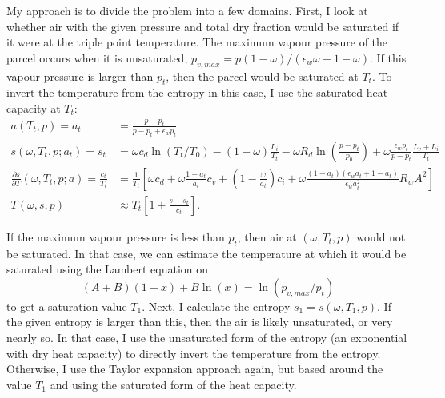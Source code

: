\documentclass{article}
\newcommand{\epsw}{\epsilon_w}
\begin{document}
My approach is to divide the problem into a few domains. First, I look at whether air with the given pressure and total dry fraction would be saturated if it were at the triple point temperature. The maximum vapour pressure of the parcel occurs when it is unsaturated, $p_{v,max} = p (1-\omega)/(\epsw \omega + 1-\omega)$. If this vapour pressure is larger than $p_t$, then the parcel would be saturated at $T_t$. To invert the temperature from the entropy in this case, I use the saturated heat capacity at $T_t$:
\begin{align*}
    a(T_t,p) = a_t &= \frac{p-p_t}{p-p_t + \epsw p_t} \\
    s(\omega,T_t,p;a_t) = s_t &= \omega c_d \ln(T_t/T_0) - (1-\omega) \frac{L_i}{T_t} - \omega R_d \ln\left( \frac{p-p_t}{p_0} \right) + \omega \frac{\epsw p_t}{p - p_t} \frac{L_v+L_i}{T_t} \\
    \frac{\partial s}{\partial T}(\omega,T_t,p;a) = \frac{c_t}{T_t} &= \frac{1}{T_t} \left[ \omega c_d + \omega \frac{1-a_t}{a_t} c_v + \left( 1 - \frac{\omega}{a_t} \right) c_i + \omega \frac{(1-a_t) (\epsw a_t + 1-a_t)}{\epsw a_t^2} R_w A^2 \right] \\
    T(\omega,s,p) &\approx T_t \left[ 1 + \frac{s-s_t}{c_t} \right].
\end{align*}

If the maximum vapour pressure is less than $p_t$, then air at $(\omega,T_t,p)$ would not be saturated. In that case, we can estimate the temperature at which it would be saturated using the Lambert equation on
\begin{equation*}
    (A+B) (1-x) + B \ln(x) = \ln(p_{v,max}/p_t)
\end{equation*}
to get a saturation value $T_1$. Next, I calculate the entropy $s_1 = s(\omega,T_1,p)$. If the given entropy is larger than this, then the air is likely unsaturated, or very nearly so. In that case, I use the unsaturated form of the entropy (an exponential with dry heat capacity) to directly invert the temperature from the entropy. Otherwise, I use the Taylor expansion approach again, but based around the value $T_1$ and using the saturated form of the heat capacity. 
\end{document}
